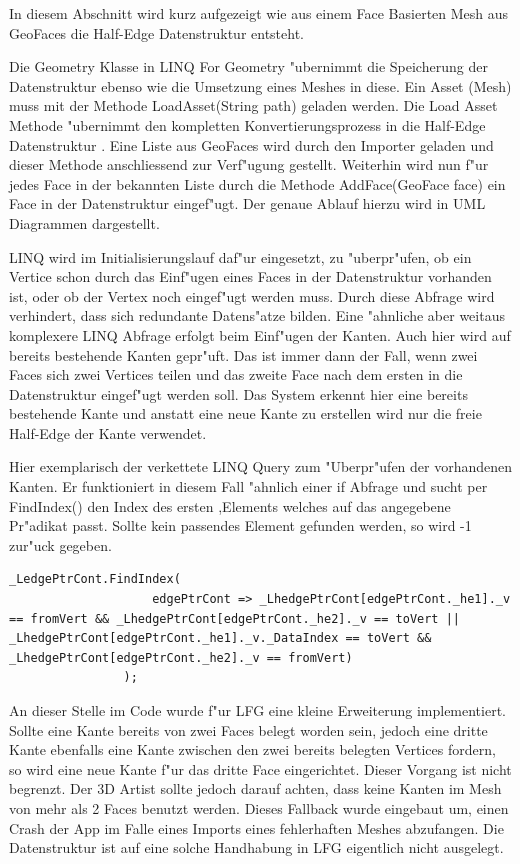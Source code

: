 \documentclass[pagesize, paper=a4, fontsize=12pt,titlepage=true, headings=small, headnosepline, abstractoff, liststotoc, nochapterprefix, plainheadsepline]{scrreprt}
\newcommand{\LFGS}{LINQ For Geometry }
\newcommand{\HES}{Half-Edge Datenstruktur }
\begin{document}
			In diesem Abschnitt wird kurz aufgezeigt wie aus einem Face Basierten Mesh aus GeoFaces die \HES entsteht.

Die Geometry Klasse in \LFGS "ubernimmt die Speicherung der Datenstruktur ebenso wie die Umsetzung eines Meshes in diese. Ein Asset (Mesh) muss mit der Methode LoadAsset(String path) geladen werden. Die Load Asset Methode "ubernimmt den kompletten Konvertierungsprozess in die \HES. Eine Liste aus GeoFaces wird durch den Importer geladen und dieser Methode anschliessend zur Verf"ugung gestellt. Weiterhin wird nun f"ur jedes Face in der bekannten Liste durch die Methode AddFace(GeoFace face) ein Face in der Datenstruktur eingef"ugt. Der genaue Ablauf hierzu wird in UML Diagrammen dargestellt.

LINQ wird im Initialisierungslauf daf"ur eingesetzt, zu "uberpr"ufen, ob ein Vertice schon durch das Einf"ugen eines Faces in der Datenstruktur vorhanden ist, oder ob der Vertex noch eingef"ugt werden muss. Durch diese Abfrage wird verhindert, dass sich redundante Datens"atze bilden. Eine "ahnliche aber weitaus komplexere LINQ Abfrage erfolgt beim Einf"ugen der Kanten. Auch hier wird auf bereits bestehende Kanten gepr"uft. Das ist immer dann der Fall, wenn zwei Faces sich zwei Vertices teilen und das zweite Face nach dem ersten in die Datenstruktur eingef"ugt werden soll. Das System erkennt hier eine bereits bestehende Kante und anstatt eine neue Kante zu erstellen wird nur die freie Half-Edge der Kante verwendet.
\newline

Hier exemplarisch der verkettete LINQ Query zum "Uberpr"ufen der vorhandenen Kanten. Er funktioniert in diesem Fall "ahnlich einer if Abfrage und sucht per FindIndex() den Index des ersten ,Elements welches auf das angegebene Pr"adikat passt. Sollte kein passendes Element gefunden werden, so wird -1 zur"uck gegeben.

\begin{lstlisting}
_LedgePtrCont.FindIndex(
                    edgePtrCont => _LhedgePtrCont[edgePtrCont._he1]._v == fromVert && _LhedgePtrCont[edgePtrCont._he2]._v == toVert || _LhedgePtrCont[edgePtrCont._he1]._v._DataIndex == toVert && _LhedgePtrCont[edgePtrCont._he2]._v == fromVert)
                );
\end{lstlisting}

An dieser Stelle im Code wurde f"ur LFG eine kleine Erweiterung implementiert. Sollte eine Kante bereits von zwei Faces belegt worden sein, jedoch eine dritte Kante ebenfalls eine Kante zwischen den zwei bereits belegten Vertices fordern, so wird eine neue Kante f"ur das dritte Face eingerichtet. Dieser Vorgang ist nicht begrenzt. Der 3D Artist sollte jedoch darauf achten, dass keine Kanten im Mesh von mehr als 2 Faces benutzt werden. Dieses Fallback wurde eingebaut um, einen Crash der App im Falle eines Imports eines fehlerhaften Meshes abzufangen. Die Datenstruktur ist auf eine solche Handhabung in LFG eigentlich nicht ausgelegt.
\end{document}
